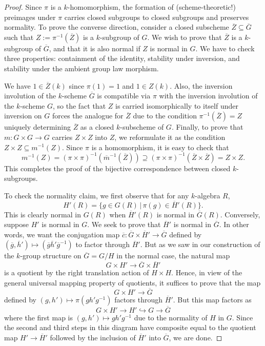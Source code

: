 \documentclass[10pt]{article}
\renewcommand{\(}{\left(}
\renewcommand{\)}{\right)}
\numberwithin{thm}{subsection}
\begin{document}
\begin{proof}
Since $\pi$ is a $k$-homomorphism, the formation of (scheme-theoretic!) preimages under $\pi$
carries closed subgroups to closed subgroups and preserves normality. 
To prove the converse direction, consider a closed subscheme $\overline{Z} \subseteq \overline{G}$
such that $Z := \pi^{-1}(\overline{Z})$ is a $k$-subgroup of $G$.  We wish to prove that
$\overline{Z}$ is a $k$-subgroup of $\overline{G}$, and that it is also normal if $Z$ is normal in $G$.
We have to check three properties: containment of the identity, stability under inversion, 
and stability under the ambient group law morphism. 

We have $1 \in \overline{Z}(k)$ since $\pi(1) = 1$ and $1 \in Z(k)$.  Also, the inversion
involution of the $k$-scheme $\overline{G}$ is compatible via $\pi$ with the inversion involution of
the $k$-scheme $G$, so the fact that $Z$ is carried isomorphically to itself under
inversion on $G$ forces the analogue for $\overline{Z}$ due to the condition
$\pi^{-1}(\overline{Z}) = Z$ uniquely determining $\overline{Z}$ as a closed $k$-subscheme of $G$. 
Finally, to prove that $m:G \times G \rightarrow G$ carries $Z \times Z$ into $Z$,
we reformulate it as the condition $Z \times Z \subseteq m^{-1}(Z)$.  Since
$\pi$ is a homomorphism, it is easy to check that 
$$m^{-1}(Z) = (\pi \times \pi)^{-1}(\overline{m}^{-1}(\overline{Z})) \supseteq 
(\pi \times \pi)^{-1}(\overline{Z} \times \overline{Z}) = Z \times Z.$$
This completes the proof of the bijective correspondence between closed $k$-subgroups. 

To check the normality claim, we first observe that for any $k$-algebra $R$,
$$H'(R) = \{g \in G(R)\,|\,\pi(g) \in \overline{H}'(R)\}.$$
This is clearly normal in $G(R)$ when $\overline{H}'(R)$ is normal in $\overline{G}(R)$.
Conversely, suppose $H'$ is normal in $G$.  We seek to prove that
$\overline{H}'$ is normal in $\overline{G}$.  In other words, we want the conjugation map 
$\overline{c}:\overline{G} \times \overline{H}' \rightarrow \overline{G}$
defined by $(\overline{g}, \overline{h}') \mapsto (\overline{g} \overline{h}' \overline{g}^{-1})$
to factor through $\overline{H}'$.  But as we saw in our construction of the $k$-group structure
on $\overline{G} = G/H$ in the normal case, the natural map
$$G \times H' \rightarrow \overline{G} \times \overline{H}'$$
is a quotient by the right translation action of $H \times H$.  Hence, in view of the general
universal mapping property of quotients, it suffices to prove that the map
$$G \times H' \rightarrow \overline{G}$$
defined by $(g,h') \mapsto \pi(gh' g^{-1})$ factors through $\overline{H}'$.  But this map factors
as $$G \times H' \rightarrow H' \hookrightarrow G \rightarrow \overline{G}$$
where the first map is $(g,h') \mapsto gh'g^{-1}$ due to the normality of $H$ in $G$. 
Since the second and third steps in this diagram have composite equal to the quotient map
$H' \rightarrow \overline{H}'$ followed by the inclusion of $\overline{H}'$ into $\overline{G}$, 
we are done.


\end{proof}
\end{document}
